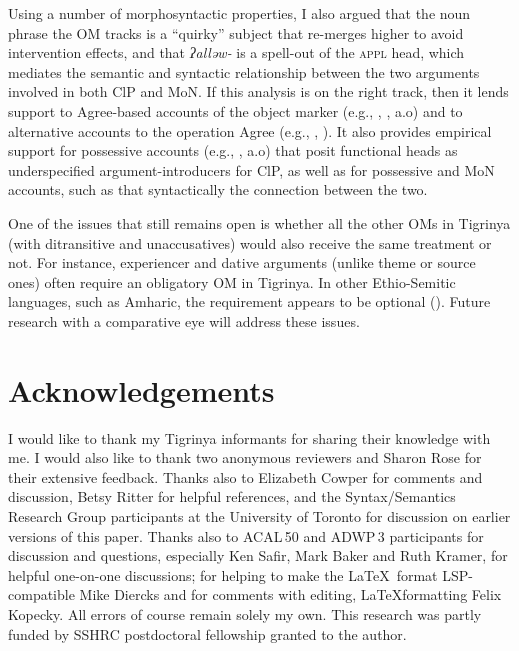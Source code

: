\documentclass[output=paper]{langscibook}
\begin{document}
Using a number of morphosyntactic properties, I also argued that the noun phrase the OM tracks is a ``quirky'' subject that re-merges higher to avoid intervention effects, and that \emph{ʔalləw-} is a spell-out of the {\scshape appl} head, which mediates the semantic and syntactic relationship between the two arguments involved in both ClP and MoN.
 If this analysis is on the right track, then it lends support to Agree-based accounts of the object marker (e.g., \citealt{bakerandkramer13}, \citealt{compton14}, a.o) and to alternative accounts to the operation Agree (e.g., \citealt{preminger09}, \citealt{bejarandrezac09}). It also provides empirical support for possessive accounts (e.g., \citet{ritterandrosen1997}, a.o) that posit functional heads as underspecified argument-introducers for ClP, as well as for possessive and MoN accounts, such as \citet{cowperandbjorkman2016} that syntactically the connection between the two.
 
 One of the issues that still remains open is whether all the other OMs in Tigrinya (with ditransitive and unaccusatives) would also receive the same treatment or not. For instance, experiencer and dative arguments (unlike theme or source ones) often require an obligatory OM in Tigrinya. In other Ethio-Semitic languages, such as Amharic, the requirement appears to be optional (\citealt{Leslau:1995}). Future research with a comparative eye will address these issues.

\section*{Acknowledgements}

I would like to thank my Tigrinya informants for sharing their knowledge with me. I would also like to thank two anonymous reviewers and Sharon Rose for their extensive feedback. Thanks also to Elizabeth Cowper for comments and discussion, Betsy Ritter for helpful references, and the Syntax/Semantics Research Group participants at the University of Toronto for discussion on earlier versions of this paper. Thanks also to ACAL\,50 and ADWP\,3 participants for discussion and questions, especially Ken Safir, Mark Baker and Ruth Kramer, for helpful one-on-one discussions; for helping to make the \LaTeX\ format LSP-compatible Mike Diercks and for comments with editing, \LaTeX formatting Felix Kopecky. All errors of course remain solely my own. This research was partly funded by SSHRC postdoctoral fellowship granted to the author.
\end{document}

